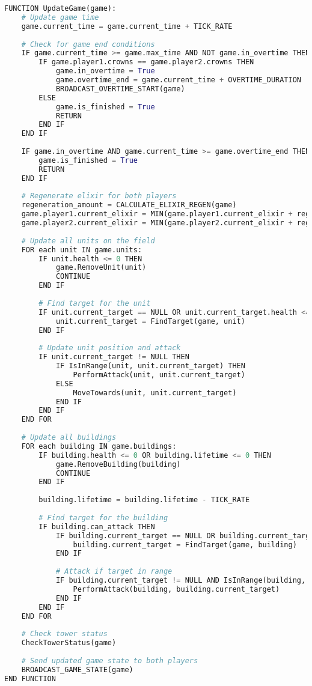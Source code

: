 \documentclass{article}
\begin{document}
\begin{lstlisting}[language=Python, caption=Battle Update Logic]
FUNCTION UpdateGame(game):
    # Update game time
    game.current_time = game.current_time + TICK_RATE
    
    # Check for game end conditions
    IF game.current_time >= game.max_time AND NOT game.in_overtime THEN
        IF game.player1.crowns == game.player2.crowns THEN
            game.in_overtime = True
            game.overtime_end = game.current_time + OVERTIME_DURATION
            BROADCAST_OVERTIME_START(game)
        ELSE
            game.is_finished = True
            RETURN
        END IF
    END IF
    
    IF game.in_overtime AND game.current_time >= game.overtime_end THEN
        game.is_finished = True
        RETURN
    END IF
    
    # Regenerate elixir for both players
    regeneration_amount = CALCULATE_ELIXIR_REGEN(game)
    game.player1.current_elixir = MIN(game.player1.current_elixir + regeneration_amount, MAX_ELIXIR)
    game.player2.current_elixir = MIN(game.player2.current_elixir + regeneration_amount, MAX_ELIXIR)
    
    # Update all units on the field
    FOR each unit IN game.units:
        IF unit.health <= 0 THEN
            game.RemoveUnit(unit)
            CONTINUE
        END IF
        
        # Find target for the unit
        IF unit.current_target == NULL OR unit.current_target.health <= 0 THEN
            unit.current_target = FindTarget(game, unit)
        END IF
        
        # Update unit position and attack
        IF unit.current_target != NULL THEN
            IF IsInRange(unit, unit.current_target) THEN
                PerformAttack(unit, unit.current_target)
            ELSE
                MoveTowards(unit, unit.current_target)
            END IF
        END IF
    END FOR
    
    # Update all buildings
    FOR each building IN game.buildings:
        IF building.health <= 0 OR building.lifetime <= 0 THEN
            game.RemoveBuilding(building)
            CONTINUE
        END IF
        
        building.lifetime = building.lifetime - TICK_RATE
        
        # Find target for the building
        IF building.can_attack THEN
            IF building.current_target == NULL OR building.current_target.health <= 0 THEN
                building.current_target = FindTarget(game, building)
            END IF
            
            # Attack if target in range
            IF building.current_target != NULL AND IsInRange(building, building.current_target) THEN
                PerformAttack(building, building.current_target)
            END IF
        END IF
    END FOR
    
    # Check tower status
    CheckTowerStatus(game)
    
    # Send updated game state to both players
    BROADCAST_GAME_STATE(game)
END FUNCTION
\end{lstlisting}
\end{document}
